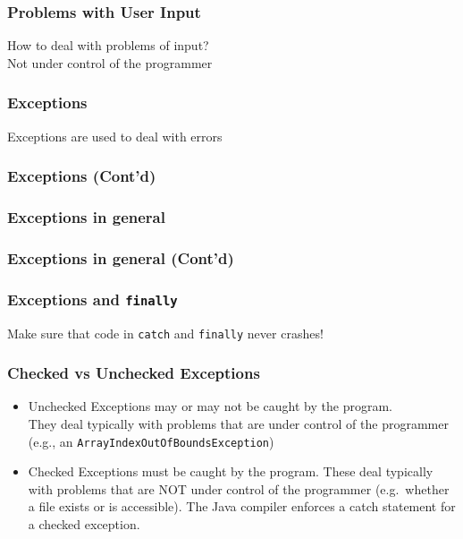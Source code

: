 \documentclass{beamer}
\def\mcolor#1#2{\rule{0ex}{0ex}\color{#1}#2\color{black}{}}
\begin{document}
\begin{frame}
\frametitle{Problems with User Input}
\mcolor{blue}{How to deal with problems of input?} \\
Not under control of the programmer\\\bigskip

\end{frame}

\begin{frame}
\frametitle{Exceptions}
Exceptions are used to deal with errors

\end{frame}

\begin{frame}
\frametitle{Exceptions (Cont'd)}\vspace{-3ex}\renewcommand{\baselinestretch}{0}\footnotesize

\end{frame}

\begin{frame}
\frametitle{Exceptions in general}

\end{frame}

\begin{frame}
\frametitle{Exceptions in general (Cont'd)}

\end{frame}

\begin{frame}
\frametitle{Exceptions and \texttt{finally}}


Make sure that code in \texttt{catch} and \texttt{finally} never crashes!
\end{frame}

\begin{frame}
\frametitle{Checked vs Unchecked Exceptions}

\begin{itemize}
\item \mcolor{blue}{Unchecked Exceptions} may or may not be caught by the program.\\
  They deal typically with problems that are under control of the
  programmer (e.g., an \texttt{ArrayIndexOutOfBoundsException})
\item \mcolor{blue}{Checked Exceptions} must be caught by the program.
  These deal typically with problems that are NOT under control of the
  programmer (e.g.\ whether a file exists or is accessible). The Java
  compiler enforces a catch statement for a checked exception.
\end{itemize}
\end{frame}
\end{document}
